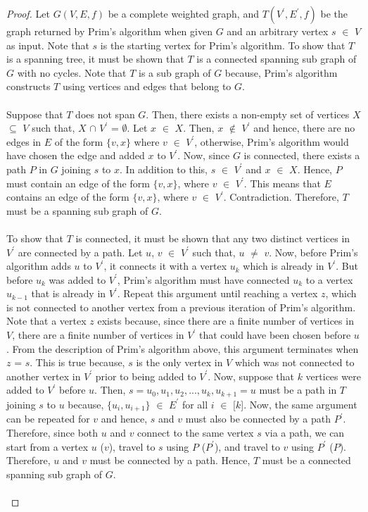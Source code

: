 \documentclass[12pt]{article}
\numberwithin{equation}{subsection}
\numberwithin{table}{subsection}
\numberwithin{algorithm}{subsection}
\begin{document}
\begin{proof}
Let $G(V,E,f)$ be a complete weighted graph, and $T(V^\prime,E^\prime,f)$ be the graph returned by Prim's algorithm when given $G$ and an arbitrary vertex $s$ $\in$ $V$ as input. Note that $s$ is the starting vertex for Prim's algorithm. To show that $T$ is a spanning tree, it must be shown that $T$ is a connected spanning sub graph of $G$ with no cycles. Note that $T$ is a sub graph of $G$ because, Prim's algorithm constructs $T$ using vertices and edges that belong to $G$.\\\\
Suppose that $T$ does not span $G$. Then, there exists a non-empty set of vertices $X$ $\subseteq$ $V$ such that, $X$ $\cap$ $V^\prime$ = $\emptyset$. Let $x$ $\in$ $X$. Then, $x$ $\notin$ $V^\prime$ and hence, there are no edges in $E$ of the form $\{v,x\}$ where $v$ $\in$ $V^\prime$, otherwise, Prim's algorithm would have chosen the edge and added $x$ to $V^\prime$. Now, since $G$ is connected, there exists a path $P$ in $G$ joining $s$ to $x$. In addition to this, $s$ $\in$ $V^\prime$ and $x$ $\in$ $X$. Hence, $P$ must contain an edge of the form $\{v, x\}$, where $v$ $\in$ $V^\prime$. This means that $E$ contains an edge of the form $\{v, x\}$, where $v$ $\in$ $V^\prime$. Contradiction. Therefore, $T$ must be a spanning sub graph of $G$.\\\\
To show that $T$ is connected, it must be shown that any two distinct vertices in $V^\prime$ are connected by a path. Let $u$, $v$ $\in$ $V^\prime$ such that, $u$ $\neq$ $v$. Now, before Prim's algorithm adds $u$ to $V^\prime$, it connects it with a vertex $u_k$ which is already in $V^\prime$. But before $u_k$ was added to $V^\prime$, Prim's algorithm must have connected $u_k$ to a vertex $u_{k-1}$ that is already in $V^\prime$. Repeat this argument until reaching a vertex $z$, which is not connected to another vertex from a previous iteration of Prim's algorithm. Note that a vertex $z$ exists because, since there are a finite number of vertices in $V$, there are a finite number of vertices in $V^\prime$ that could have been chosen before $u$. From the description of Prim's algorithm above, this argument terminates when $z$ = $s$. This is true because, $s$ is the only vertex in $V$ which was not connected to another vertex in $V^\prime$ prior to being added to $V^\prime$. Now, suppose that $k$ vertices were added to $V^\prime$ before $u$. Then, $s= u_0, u_1, u_2, ..., u_k, u_{k+1} = u$ must be a path in $T$ joining $s$ to $u$ because, $\{u_i, u_{i+1}\}$ $\in$ $E^\prime$ for all $i$ $\in$ [$k$]. Now, the same argument can be repeated for $v$ and hence, $s$ and $v$ must also be connected by a path $P^\prime$. Therefore, since both $u$ and $v$ connect to the same vertex $s$ via a path, we can start from a vertex $u$ ($v$), travel to $s$ using $P$ ($P^\prime$), and travel to $v$ using $P^\prime$ ($P$). Therefore, $u$ and $v$ must be connected by a path. Hence, $T$ must be a connected spanning sub graph of $G$.\\\\

\end{proof}
\end{document}
